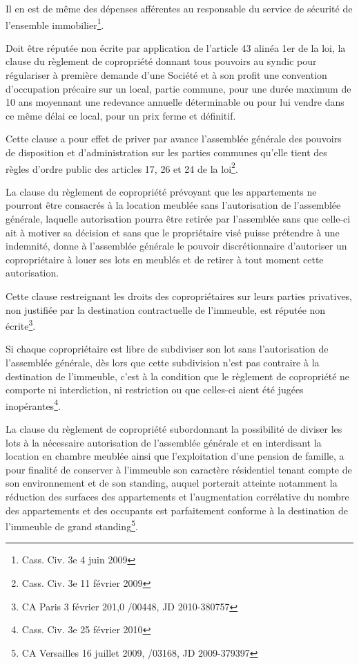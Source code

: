			Il en est de même des dépenses afférentes au responsable du service de sécurité de l’ensemble immobilier\footnote{Cass. Civ. 3e 4 juin 2009}.

			Doit être réputée non écrite par application de l’article 43 alinéa 1er de la loi, la clause du règlement de copropriété donnant tous pouvoirs au syndic pour régulariser à première demande d’une Société et à son profit une convention d’occupation précaire sur un local, partie commune, pour une durée maximum de 10 ans moyennant une redevance annuelle déterminable ou pour lui vendre dans ce même délai ce local, pour un prix ferme et définitif.
			
			Cette clause a pour effet de priver par avance l’assemblée générale des pouvoirs de disposition et d’administration sur les parties communes qu’elle tient des règles d’ordre public des articles 17, 26 et 24 de la loi\footnote{Cass. Civ. 3e 11 février 2009}.
			
			La clause du règlement de copropriété prévoyant que les appartements ne pourront être consacrés à la location meublée sans l’autorisation de l’assemblée générale, laquelle autorisation pourra être retirée par l’assemblée sans que celle-ci ait à motiver sa décision et sans que le propriétaire visé puisse prétendre à une indemnité, donne à l’assemblée générale le pouvoir discrétionnaire d’autoriser un copropriétaire à louer ses lots en meublés et de retirer à tout moment cette autorisation.
			
			Cette clause restreignant les droits des copropriétaires sur leurs parties privatives, non justifiée par la destination contractuelle de l’immeuble, est réputée non écrite\footnote{CA Paris 3 février 201,0 /00448, JD 2010-380757}.
			
			Si chaque copropriétaire est libre de subdiviser son lot sans l’autorisation de l’assemblée générale, dès lors que cette subdivision n’est pas contraire à la destination de l’immeuble, c’est à la condition que le règlement de copropriété ne comporte ni interdiction, ni restriction ou que celles-ci aient été jugées inopérantes\footnote{Cass. Civ. 3e 25 février 2010}.
			
			La clause du règlement de copropriété subordonnant la possibilité de diviser les lots à la nécessaire autorisation de l’assemblée générale et en interdisant la location en chambre meublée ainsi que l’exploitation d’une pension de famille, a pour finalité de conserver à l’immeuble son caractère résidentiel tenant compte de son environnement et de son standing, auquel porterait atteinte notamment la réduction des surfaces des appartements et l’augmentation corrélative du nombre des appartements et des occupants est parfaitement conforme à la destination de l’immeuble de grand standing\footnote{CA Versailles 16 juillet 2009, /03168, JD 2009-379397}.
	
